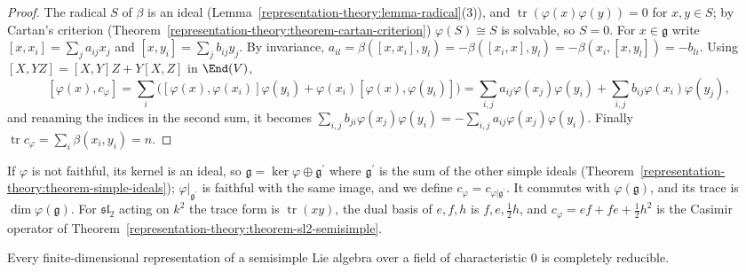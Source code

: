 \begin{proof}
The radical $S$ of $\beta$ is an ideal (Lemma~\ref{representation-theory:lemma-radical}(3)), and $\operatorname{tr}(\varphi(x)\varphi(y)) = 0$ for $x, y \in S$; by Cartan's
criterion (Theorem~\ref{representation-theory:theorem-cartan-criterion}) $\varphi(S) \cong S$ is solvable, so $S = 0$. For $x \in \mathfrak{g}$ write $[x, x_i] = \sum_ja_{ij}x_j$ and
$[x, y_i] = \sum_jb_{ij}y_j$. By invariance, $a_{il} = \beta([x, x_i], y_l) = -\beta([x_i, x], y_l) = -\beta(x_i, [x, y_l]) = -b_{li}$. Using
$[X, YZ] = [X, Y]Z + Y[X, Z]$ in $\End(V)$,
\[
[\varphi(x), c_\varphi] = \sum_i\bigl([\varphi(x), \varphi(x_i)]\varphi(y_i) + \varphi(x_i)[\varphi(x), \varphi(y_i)]\bigr) = \sum_{i,j}a_{ij}\varphi(x_j)\varphi(y_i) +
\sum_{i,j}b_{ij}\varphi(x_i)\varphi(y_j),
\]
and renaming the indices in the second sum, it becomes $\sum_{i,j}b_{ji}\varphi(x_j)\varphi(y_i) = -\sum_{i,j}a_{ij}\varphi(x_j)\varphi(y_i)$. Finally
$\operatorname{tr}c_\varphi = \sum_i\beta(x_i, y_i) = n$.
\end{proof}

If $\varphi$ is not faithful, its kernel is an ideal, so $\mathfrak{g} = \ker\varphi \oplus \mathfrak{g}^{\prime}$ where $\mathfrak{g}^{\prime}$ is the sum of the other simple ideals
(Theorem~\ref{representation-theory:theorem-simple-ideals}); $\varphi|_{\mathfrak{g}^{\prime}}$ is faithful with the same image, and we define
$c_\varphi = c_{\varphi|\mathfrak{g}^{\prime}}$. It commutes with $\varphi(\mathfrak{g})$, and its trace is $\dim\varphi(\mathfrak{g})$. For $\mathfrak{sl}_2$ acting on $k^2$ the
trace form is $\operatorname{tr}(xy)$, the dual basis of $e, f, h$ is $f, e, \frac12h$, and $c_\varphi = ef + fe + \frac12h^2$ is the Casimir operator of
Theorem~\ref{representation-theory:theorem-sl2-semisimple}.

\begin{theorem}[Weyl]\label{representation-theory:theorem-weyl}
Every finite-dimensional representation of a semisimple Lie algebra over a field of characteristic $0$ is completely reducible.
\end{theorem}

